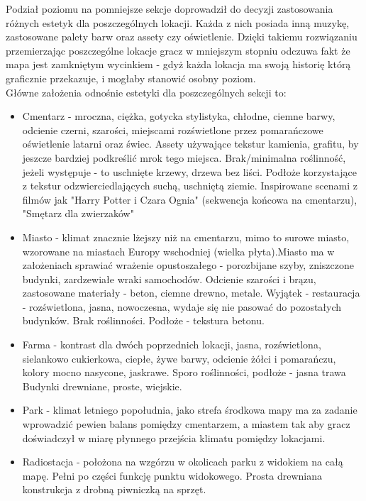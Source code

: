 Podział poziomu na pomniejsze sekcje doprowadził do decyzji zastosowania różnych estetyk dla poszczególnych lokacji.
Każda z nich posiada inną muzykę, zastosowane palety barw oraz assety czy oświetlenie.
Dzięki takiemu rozwiązaniu przemierzając poszczególne lokacje gracz w mniejszym stopniu odczuwa fakt że mapa jest zamkniętym wycinkiem - gdyż każda lokacja ma swoją historię którą graficznie przekazuje, i mogłaby stanowić osobny poziom.\\
Główne założenia odnośnie estetyki dla poszczególnych sekcji to:
\begin{itemize}
    \item Cmentarz - mroczna, ciężka, gotycka stylistyka, chłodne, ciemne barwy, odcienie czerni, szarości, miejscami rozświetlone przez pomarańczowe oświetlenie latarni oraz świec.
    Assety używające tekstur kamienia, grafitu, by jeszcze bardziej podkreślić mrok tego miejsca.
    Brak/minimalna roślinność, jeżeli występuje - to uschnięte krzewy, drzewa bez liści.
    Podłoże korzystające z tekstur odzwierciedlających suchą, uschniętą ziemie.
    Inspirowane scenami z filmów jak "Harry Potter i Czara Ognia" (sekwencja końcowa na cmentarzu), "Smętarz dla zwierzaków"
    \item Miasto - klimat znacznie lżejszy niż na cmentarzu, mimo to surowe miasto, wzorowane na miastach Europy wschodniej (wielka płyta).Miasto ma w założeniach sprawiać wrażenie opustoszałego - porozbijane szyby, zniszczone budynki, zardzewiałe wraki samochodów.
    Odcienie szarości i brązu, zastosowane materiały - beton, ciemne drewno, metale.
    Wyjątek - restauracja - rozświetlona, jasna, nowoczesna, wydaje się nie pasować do pozostałych budynków.
    Brak roślinności.
    Podłoże - tekstura betonu.
    \item Farma - kontrast dla dwóch poprzednich lokacji, jasna, rozświetlona, sielankowo cukierkowa, ciepłe, żywe barwy, odcienie żółci i pomarańczu, kolory mocno nasycone, jaskrawe.
    Sporo roślinności, podłoże - jasna trawa
    Budynki drewniane, proste, wiejskie.
    \item Park - klimat letniego popołudnia, jako strefa środkowa mapy ma za zadanie wprowadzić pewien balans pomiędzy cmentarzem, a miastem tak aby gracz doświadczył w miarę płynnego przejścia klimatu pomiędzy lokacjami. 
    \item Radiostacja - położona na wzgórzu w okolicach parku z widokiem na całą mapę. Pełni po części funkcję punktu widokowego. Prosta drewniana konstrukcja z drobną piwniczką na sprzęt.
\end{itemize}

